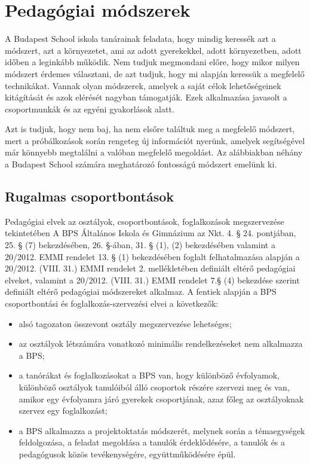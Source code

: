 \hypertarget{pedagogiai-modszerek}{%
\section{Pedagógiai módszerek}\label{pedagogiai-modszerek}}

A Budapest School iskola tanárainak feladata, hogy mindig keressék azt a
módszert, azt a környezetet, ami az adott gyerekekkel, adott
környezetben, adott időben a leginkább működik. Nem tudjuk megmondani
előre, hogy mikor milyen módszert érdemes választani, de azt tudjuk,
hogy mi alapján keressük a megfelelő technikákat. Vannak olyan
módszerek, amelyek a saját célok lehetőségeinek kitágítását és azok
elérését nagyban támogatják. Ezek alkalmazása javasolt a csoportmunkák
és az egyéni gyakorlások alatt.

Azt is tudjuk, hogy nem baj, ha nem elsőre találtuk meg a megfelelő
módszert, mert a próbálkozások során rengeteg új információt nyerünk,
amelyek segítségével már könnyebb megtalálni a valóban megfelelő
megoldást. Az alábbiakban néhány a Budapest School számára meghatározó
fontosságú módszert emelünk ki.

\hypertarget{rugalmas-csoportbontasok}{%
\subsection{Rugalmas csoportbontások}\label{rugalmas-csoportbontasok}}

Pedagógiai elvek az osztályok, csoportbontások, foglalkozások
megszervezése tekintetében A BPS Általános Iskola és Gimnázium az Nkt.
4. § 24. pontjában, 25. § (7) bekezdésében, 26. §-ában, 31. § (1), (2)
bekezdésében valamint a 20/2012. EMMI rendelet 13. § (1) bekezdésében
foglalt felhatalmazása alapján a 20/2012. (VIII. 31.) EMMI rendelet 2.
mellékletében definiált eltérő pedagógiai elveket, valamint a 20/2012.
(VIII. 31.) EMMI rendelet 7.§ (4) bekezdése szerint definiált eltérő
pedagógiai módszereket alkalmaz. A fentiek alapján a BPS csoportbontási
és foglalkozás-szervezési elvei a következők:

\begin{itemize}
\tightlist
\item
  alsó tagozaton összevont osztály megszervezése lehetséges;
\item
  az osztályok létszámára vonatkozó minimális rendelkezéseket nem
  alkalmazza a BPS;
\item
  a tanórákat és foglalkozásokat a BPS van, hogy különböző évfolyamok,
  különböző osztályok tanulóiból álló csoportok részére szervezi meg és
  van, amikor egy évfolyamra járó gyerekek csoportjának, azaz főleg az
  osztályoknak szervez egy foglalkozást;
\item
  a BPS alkalmazza a projektoktatás módszerét, melynek során a
  témaegységek feldolgozása, a feladat megoldása a tanulók
  érdeklődésére, a tanulók és a pedagógusok közös tevékenységére,
  együttműködésére épül.
\end{itemize}

